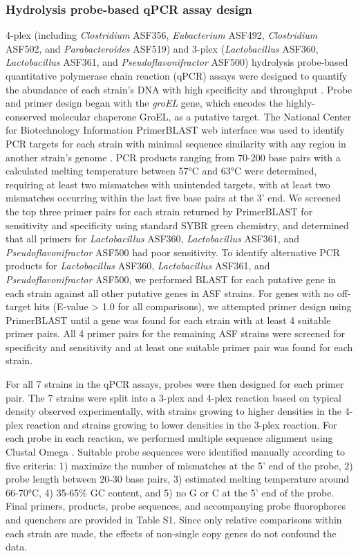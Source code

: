 \documentclass[11pt,twocolumn,notitlepage,openany,twoside]{book}
\begin{document}
\begin{refsection}
\subsubsection{Hydrolysis probe-based qPCR assay design}
4-plex (including \textit{Clostridium} ASF356, \textit{Eubacterium} ASF492, \textit{Clostridium} ASF502, and \textit{Parabacteroides} ASF519) and 3-plex (\textit{Lactobacillus} ASF360, \textit{Lactobacillus} ASF361, and \textit{Pseudoflavonifractor} ASF500) hydrolysis probe-based quantitative polymerase chain reaction (qPCR) assays were designed to quantify the abundance of each strain’s DNA with high specificity and throughput \cite{Holland1991-gw}. Probe and primer design began with the \textit{groEL} gene, which encodes the highly-conserved molecular chaperone GroEL, as a putative target. The National Center for Biotechnology Information PrimerBLAST web interface was used to identify PCR targets for each strain with minimal sequence similarity with any region in another strain’s genome \cite{Ye2012-eb}. PCR products ranging from 70-200 base pairs with a calculated melting temperature between 57°C and 63°C were determined, requiring at least two mismatches with unintended targets, with at least two mismatches occurring within the last five base pairs at the 3’ end. We screened the top three primer pairs for each strain returned by PrimerBLAST for sensitivity and specificity using standard SYBR green chemistry, and determined that all primers for \textit{Lactobacillus} ASF360, \textit{Lactobacillus} ASF361, and \textit{Pseudoflavonifractor} ASF500 had poor sensitivity. To identify alternative PCR products for \textit{Lactobacillus} ASF360, \textit{Lactobacillus} ASF361, and \textit{Pseudoflavonifractor} ASF500, we performed BLAST for each putative gene in each strain against all other putative genes in ASF strains. For genes with no off-target hits (E-value > 1.0 for all comparisons), we attempted primer design using PrimerBLAST until a gene was found for each strain with at least 4 suitable primer pairs. All 4 primer pairs for the remaining ASF strains were screened for specificity and sensitivity and at least one suitable primer pair was found for each strain.

For all 7 strains in the qPCR assays, probes were then designed for each primer pair. The 7 strains were split into a 3-plex and 4-plex reaction based on typical density observed experimentally, with strains growing to higher densities in the 4-plex reaction and strains growing to lower densities in the 3-plex reaction. For each probe in each reaction, we performed multiple sequence alignment using Clustal Omega \cite{Sievers2011-bk}. Suitable probe sequences were identified manually according to five criteria: 1) maximize the number of mismatches at the 5’ end of the probe, 2) probe length between 20-30 base pairs, 3) estimated melting temperature around 66-70°C, 4) 35-65\% GC content, and 5) no G or C at the 5’ end of the probe. Final primers, products, probe sequences, and accompanying probe fluorophores and quenchers are provided in Table S1. Since only relative comparisons within each strain are made, the effects of non-single copy genes do not confound the data.


\end{refsection}
\end{document}
